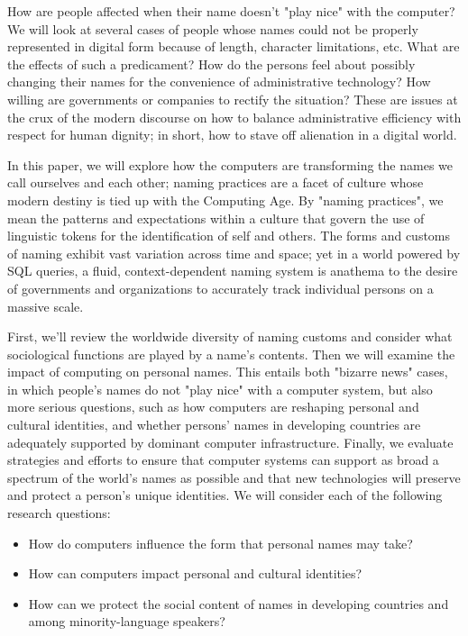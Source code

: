 How are people affected when their name doesn't "play nice" with the computer?
We will look at several cases of people whose names could not be properly
represented in digital form because of length, character limitations, etc. What
are the effects of such a predicament? How do the persons feel about possibly
changing their names for the convenience of administrative technology? How
willing are governments or companies to rectify the situation? These are issues
at the crux of the modern discourse on how to balance administrative efficiency
with respect for human dignity; in short, how to stave off alienation in a
digital world.

In this paper, we will explore how the computers are transforming the names we
call ourselves and each other; naming practices are a facet of culture whose
modern destiny is tied up with the Computing Age. By "naming practices", we mean
the patterns and expectations within a culture that govern the use of linguistic
tokens for the identification of self and others. The forms and customs of
naming exhibit vast variation across time and space; yet in a world powered by
SQL queries, a fluid, context-dependent naming system is anathema to the desire
of governments and organizations to accurately track individual persons on a
massive scale.

First, we'll review the worldwide diversity of naming customs and consider what
sociological functions are played by a name's contents. Then we will examine the
impact of computing on personal names. This entails both "bizarre news" cases,
in which people's names do not "play nice" with a computer system, but also more
serious questions, such as how computers are reshaping personal and cultural
identities, and whether persons' names in developing countries are adequately
supported by dominant computer infrastructure. Finally, we evaluate strategies
and efforts to ensure that computer systems can support as broad a spectrum of
the world's names as possible and that new technologies will preserve and
protect a person's unique identities. We will consider each of the following
research questions:

\begin{itemize}
\item How do computers influence the form that personal names may take?
\item How can computers impact personal and cultural identities?
\item How can we protect the social content of names in developing countries and
among minority-language speakers?
\end{itemize}
